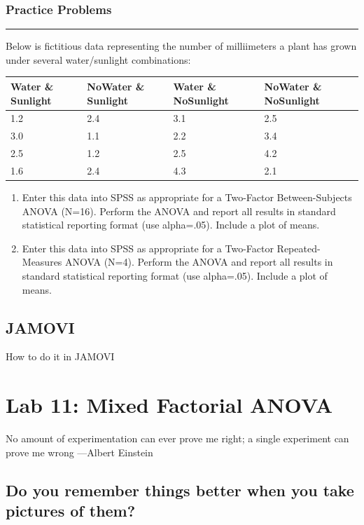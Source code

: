 \documentclass[]{book}
\begin{document}
\subsection{Practice Problems}\label{practice-problems-10}

\begin{center}\rule{0.5\linewidth}{0.5pt}\end{center}

Below is fictitious data representing the number of milliimeters a plant
has grown under several water/sunlight combinations:

\begin{longtable}[]{@{}llll@{}}
\toprule
Water \& Sunlight & NoWater \& Sunlight & Water \& NoSunlight & NoWater
\& NoSunlight\tabularnewline
\midrule
\endhead
1.2 & 2.4 & 3.1 & 2.5\tabularnewline
3.0 & 1.1 & 2.2 & 3.4\tabularnewline
2.5 & 1.2 & 2.5 & 4.2\tabularnewline
1.6 & 2.4 & 4.3 & 2.1\tabularnewline
\bottomrule
\end{longtable}

\begin{enumerate}
\def\labelenumi{\arabic{enumi}.}
\item
  Enter this data into SPSS as appropriate for a Two-Factor
  Between-Subjects ANOVA (N=16). Perform the ANOVA and report all
  results in standard statistical reporting format (use alpha=.05).
  Include a plot of means.
\item
  Enter this data into SPSS as appropriate for a Two-Factor
  Repeated-Measures ANOVA (N=4). Perform the ANOVA and report all
  results in standard statistical reporting format (use alpha=.05).
  Include a plot of means.
\end{enumerate}

\section{JAMOVI}\label{jamovi-10}

How to do it in JAMOVI

\chapter{Lab 11: Mixed Factorial
ANOVA}\label{lab-11-mixed-factorial-anova}

{ No amount of experimentation can ever prove me right; a single
experiment can prove me wrong ---Albert Einstein }

\section{Do you remember things better when you take pictures of
them?}\label{do-you-remember-things-better-when-you-take-pictures-of-them}
\end{document}
